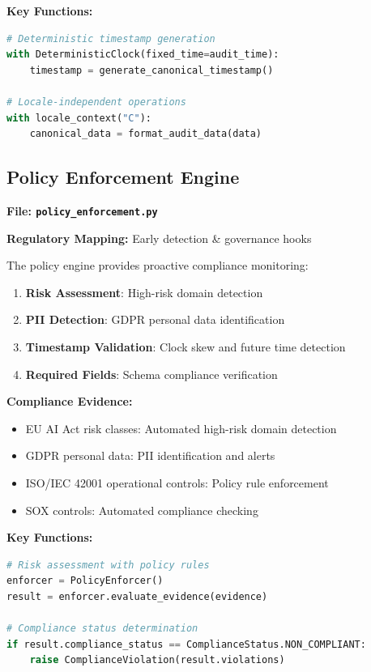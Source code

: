 \documentclass[11pt,a4paper]{article}
\begin{document}
\textbf{Key Functions:}
\begin{lstlisting}[language=Python]
# Deterministic timestamp generation
with DeterministicClock(fixed_time=audit_time):
    timestamp = generate_canonical_timestamp()

# Locale-independent operations
with locale_context("C"):
    canonical_data = format_audit_data(data)
\end{lstlisting}

\subsection{Policy Enforcement Engine}
\textbf{File: \texttt{policy\_enforcement.py}}

\textbf{Regulatory Mapping:} Early detection \& governance hooks

The policy engine provides proactive compliance monitoring:

\begin{enumerate}
    \item \textbf{Risk Assessment}: High-risk domain detection
    \item \textbf{PII Detection}: GDPR personal data identification
    \item \textbf{Timestamp Validation}: Clock skew and future time detection
    \item \textbf{Required Fields}: Schema compliance verification
\end{enumerate}

\textbf{Compliance Evidence:}
\begin{itemize}
    \item EU AI Act risk classes: Automated high-risk domain detection
    \item GDPR personal data: PII identification and alerts
    \item ISO/IEC 42001 operational controls: Policy rule enforcement
    \item SOX controls: Automated compliance checking
\end{itemize}

\textbf{Key Functions:}
\begin{lstlisting}[language=Python]
# Risk assessment with policy rules
enforcer = PolicyEnforcer()
result = enforcer.evaluate_evidence(evidence)

# Compliance status determination
if result.compliance_status == ComplianceStatus.NON_COMPLIANT:
    raise ComplianceViolation(result.violations)
\end{lstlisting}
\end{document}
